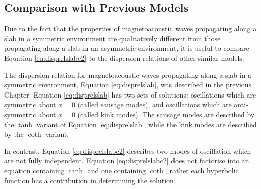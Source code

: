 \documentclass[12pt]{ociamthesis}
\begin{document}
\subsection{Comparison with Previous Models}
\label{subsec:comparison}

Due to the fact that the properties of magnetoacoustic waves propagating along a slab in a symmetric environment are qualitatively different from those propagating along a slab in an asymmetric environment, it is useful to compare Equation \eqref{eq:disprelslabc2} to the dispersion relations of other similar models.

The dispersion relation for magnetoacoustic waves propagating along a slab in a symmetric environment, Equation \eqref{eq:disprelslab}, was described in the previous Chapter.
Equation \eqref{eq:disprelslab} has two sets of solutions: oscillations which are symmetric about $x=0$ (called sausage modes), and oscillations which are anti-symmetric about $x=0$ (called kink modes).
The sausage modes are described by the $\tanh$ variant of Equation \eqref{eq:disprelslab}, while the kink modes are described by the $\coth$ variant.

In contrast, Equation \eqref{eq:disprelslabc2} describes two modes of oscillation which are not fully independent.
Equation \eqref{eq:disprelslabc2} does not factorise into an equation containing $\tanh$ and one containing $\coth$, rather each hyperbolic function has a contribution in determining the solution.
\end{document}
